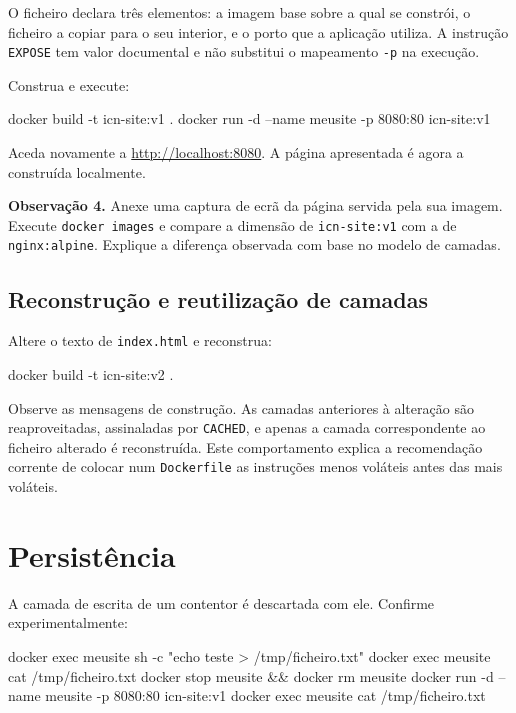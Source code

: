 \documentclass[11pt,a4paper]{article}
\begin{document}
O ficheiro declara três elementos: a imagem base sobre a qual se constrói, o ficheiro a copiar para o seu interior, e o porto que a aplicação utiliza. A instrução \texttt{EXPOSE} tem valor documental e não substitui o mapeamento \texttt{-p} na execução.

Construa e execute:

\begin{terminal}
docker build -t icn-site:v1 .
docker run -d --name meusite -p 8080:80 icn-site:v1
\end{terminal}

Aceda novamente a \url{http://localhost:8080}. A página apresentada é agora a construída localmente.

\begin{registo}
\textbf{Observação 4.} Anexe uma captura de ecrã da página servida pela sua imagem. Execute \texttt{docker images} e compare a dimensão de \texttt{icn-site:v1} com a de \texttt{nginx:alpine}. Explique a diferença observada com base no modelo de camadas.
\end{registo}

\subsection{Reconstrução e reutilização de camadas}

Altere o texto de \texttt{index.html} e reconstrua:

\begin{terminal}
docker build -t icn-site:v2 .
\end{terminal}

Observe as mensagens de construção. As camadas anteriores à alteração são reaproveitadas, assinaladas por \texttt{CACHED}, e apenas a camada correspondente ao ficheiro alterado é reconstruída. Este comportamento explica a recomendação corrente de colocar num \texttt{Dockerfile} as instruções menos voláteis antes das mais voláteis.

\section{Persistência}

A camada de escrita de um contentor é descartada com ele. Confirme experimentalmente:

\begin{terminal}
docker exec meusite sh -c "echo teste > /tmp/ficheiro.txt"
docker exec meusite cat /tmp/ficheiro.txt
docker stop meusite && docker rm meusite
docker run -d --name meusite -p 8080:80 icn-site:v1
docker exec meusite cat /tmp/ficheiro.txt
\end{terminal}
\end{document}
